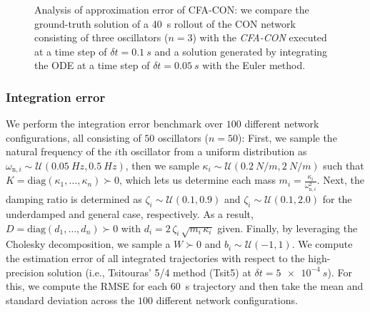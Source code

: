 \begin{figure}[ht]
    \centering
    \caption{Analysis of approximation error of CFA-CON: we compare the ground-truth solution of a \SI{40}{s} rollout of the \gls{CON} network consisting of three oscillators ($n=3$) with the \emph{CFA-CON} executed at a time step of $\delta t = \SI{0.1}{s}$ and a solution generated by integrating the \gls{ODE} at a time step of $\delta t = \SI{0.05}{s}$ with the Euler method.}
    \label{fig:con:cfa_con_comparison}
\end{figure}

\subsubsection{Integration error} 
We perform the integration error benchmark over $100$ different network configurations, all consisting of $50$ oscillators ($n=50$): First, we sample the natural frequency of the $i$th oscillator from a uniform distribution as $\omega_{\mathrm{n},i} \sim \mathcal{U}(\SI{0.05}{Hz}, \SI{0.5}{Hz})$, then we sample $\kappa_i \sim \mathcal{U}(\SI{0.2}{N\per m}, \SI{2}{N \per m})$ such that $K = \mathrm{diag}(\kappa_1, \dots, \kappa_n) \succ 0$, which lets us determine each mass $m_i = \frac{\kappa_i}{\omega_{\mathrm{n},i}^2}$.
Next, the damping ratio is determined as $\zeta_i \sim \mathcal{U}(0.1, 0.9)$ and $\zeta_i \sim \mathcal{U}(0.1, 2.0)$ for the underdamped and general case, respectively. As a result, $D = \mathrm{diag}(d_1, \dots, d_n) \succ 0$ with $d_i = 2 \, \zeta_i \, \sqrt{m_i \, \kappa_i}$ given.
Finally, by leveraging the Cholesky decomposition, we sample a $W \succ 0$  and $b_i \sim \mathcal{U}(-1, 1)$.
We compute the estimation error of all integrated trajectories with respect to the high-precision solution (i.e., Tsitouras' 5/4 method (Tsit5) at $\delta t = \num{5e-4}~\si{s}$).
For this, we compute the \gls{RMSE} for each \SI{60}{s} trajectory and then take the mean and standard deviation across the $100$ different network configurations.

